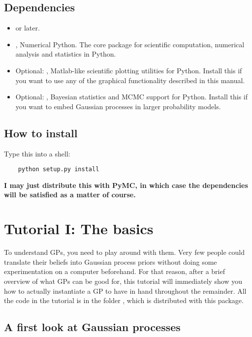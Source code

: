 \documentclass{manual}
\begin{document}
\section{Dependencies}
\begin{itemize}
	\item {} or later.
	\item {}, Numerical Python. The core package for scientific computation, numerical analysis and statistics in Python.
	\item Optional: , Matlab-like scientific plotting utilities for Python. Install this if you want to use any of the graphical functionality described in this manual.
	\item Optional: , Bayesian statistics and MCMC support for Python. Install this if you want to embed Gaussian processes in larger probability models.
\end{itemize} 

\section{How to install}\label{sec:installing}

Type this into a shell:
\begin{verbatim}
	python setup.py install
\end{verbatim}
\textbf{I may just distribute this with PyMC, in which case the dependencies will be satisfied as a matter of course.}



\chapter{Tutorial I: The basics}\label{cha:basics} %


To understand GPs, you need to play around with them. Very few people could translate their beliefs into Gaussian process priors without doing some experimentation on a computer beforehand. For that reason, after a brief overview of what GPs can be good for, this tutorial will immediately show you how to actually instantiate a GP to have in hand throughout the remainder. All the code in the tutorial is in the folder , which is distributed with this package.

\section{A first look at Gaussian processes}\label{sec:firstlook}
\end{document}
